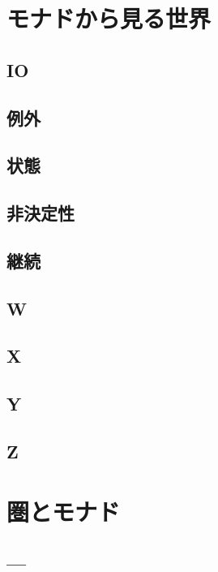 \documentclass[twocolumn]{jsbook}
\begin{document}
\part{モナドから見る世界}

\chapter{IO}

\chapter{例外}

\chapter{状態}

\chapter{非決定性}

\chapter{継続}

\chapter{W}

\chapter{X}

\chapter{Y}

\chapter{Z}


\part{圏とモナド}


\chapter{---}
\end{document}
